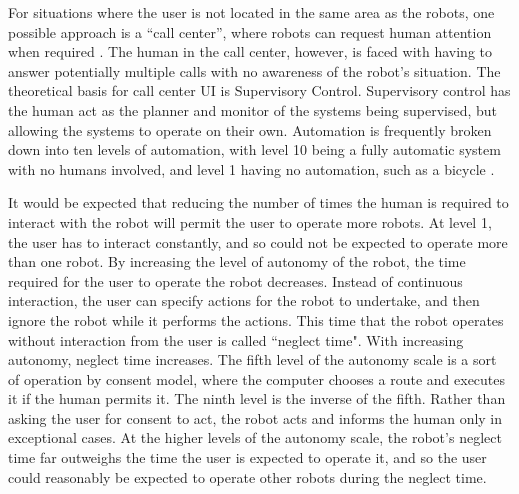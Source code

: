\documentclass[]{article}
\begin{document}
For situations where the user is not located in the same area as the robots, one possible approach is a ``call center'', where robots can request human attention when required \cite{chen2011supervisory}. 
The human in the call center, however, is faced with having to answer potentially multiple calls with no awareness of the robot's situation. 
The theoretical basis for call center UI is Supervisory Control. 
Supervisory control has the human act as the planner and monitor of the systems being supervised, but allowing the systems to operate on their own.
Automation is frequently broken down into ten levels of automation, with level 10 being a fully automatic system with no humans involved, and level 1 having no automation, such as a bicycle \cite{parasuraman2000model}. 

It would be expected that reducing the number of times the human is required to interact with the robot will permit the user to operate more robots.
At level 1, the user has to interact constantly, and so could not be expected to operate more than one robot. 
By increasing the level of autonomy of the robot, the time required for the user to operate the robot decreases.
Instead of continuous interaction, the user can specify actions for the robot to undertake, and then ignore the robot while it performs the actions.
This time that the robot operates without interaction from the user is called ``neglect time".
With increasing autonomy, neglect time increases.
The fifth level of the autonomy scale is a sort of operation by consent model, where the computer chooses a route and executes it if the human permits it. 
The ninth level is the inverse of the fifth.
Rather than asking the user for consent to act, the robot acts and informs the human only in exceptional cases. 
At the higher levels of the autonomy scale, the robot's neglect time far outweighs the time the user is expected to operate it, and so the user could reasonably be expected to operate other robots during the neglect time. 
\end{document}
